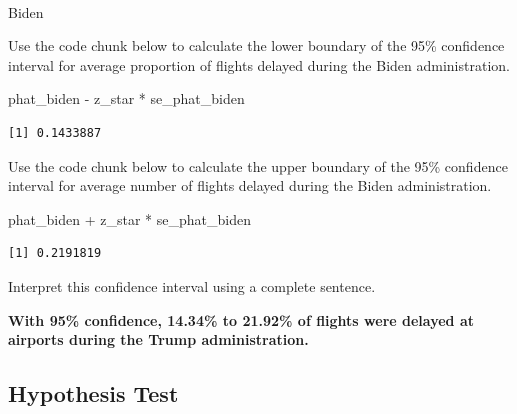 \documentclass[
  letterpaper,
  DIV=11,
  numbers=noendperiod]{scrartcl}
\makeatletter
\let\oldparagraph\paragraph
\renewcommand{\paragraph}{
    \@ifstar
      \xxxParagraphStar
      \xxxParagraphNoStar
  }
\newcommand{\xxxParagraphStar}[1]{\oldparagraph*{#1}\mbox{}}
\newcommand{\xxxParagraphNoStar}[1]{\oldparagraph{#1}\mbox{}}
\newenvironment{Shaded}{\begin{snugshade}}{\end{snugshade}}
\newcommand{\NormalTok}[1]{\textcolor[rgb]{0.00,0.23,0.31}{#1}}
\newcommand{\SpecialCharTok}[1]{\textcolor[rgb]{0.37,0.37,0.37}{#1}}
\makeatother
\begin{document}
\paragraph{Biden}\label{biden}

Use the code chunk below to calculate the lower boundary of the 95\%
confidence interval for average proportion of flights delayed during the
Biden administration.

\begin{Shaded}
\begin{Highlighting}[]
\NormalTok{phat\_biden }\SpecialCharTok{{-}}\NormalTok{ z\_star }\SpecialCharTok{*}\NormalTok{ se\_phat\_biden}
\end{Highlighting}
\end{Shaded}

\begin{verbatim}
[1] 0.1433887
\end{verbatim}

Use the code chunk below to calculate the upper boundary of the 95\%
confidence interval for average number of flights delayed during the
Biden administration.

\begin{Shaded}
\begin{Highlighting}[]
\NormalTok{phat\_biden }\SpecialCharTok{+}\NormalTok{ z\_star }\SpecialCharTok{*}\NormalTok{ se\_phat\_biden}
\end{Highlighting}
\end{Shaded}

\begin{verbatim}
[1] 0.2191819
\end{verbatim}

Interpret this confidence interval using a complete sentence.

\begin{tcolorbox}[enhanced jigsaw, toprule=.15mm, breakable, leftrule=.75mm, bottomrule=.15mm, rightrule=.15mm, colback=white, opacityback=0, colframe=quarto-callout-warning-color-frame, left=2mm, arc=.35mm]

\textbf{With 95\% confidence, 14.34\% to 21.92\% of flights were delayed
at airports during the Trump administration.}

\end{tcolorbox}

\subsection{Hypothesis Test}\label{hypothesis-test}
\end{document}
